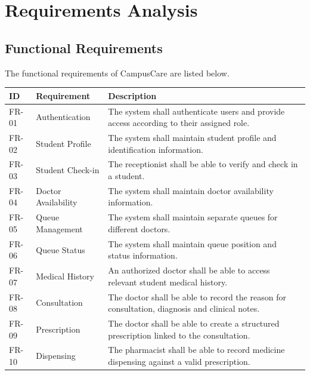 \documentclass{tietreport}
\begin{document}
\chapter{Requirements Analysis}

\section{Functional Requirements}

The functional requirements of CampusCare are listed below.

\begin{longtable}{p{1.3cm}p{4.0cm}p{7.0cm}}
\toprule
\textbf{ID} & \textbf{Requirement} & \textbf{Description} \\
\midrule

FR-01 &
Authentication &
The system shall authenticate users and provide access according to
their assigned role. \\

FR-02 &
Student Profile &
The system shall maintain student profile and identification
information. \\

FR-03 &
Student Check-in &
The receptionist shall be able to verify and check in a student. \\

FR-04 &
Doctor Availability &
The system shall maintain doctor availability information. \\

FR-05 &
Queue Management &
The system shall maintain separate queues for different doctors. \\

FR-06 &
Queue Status &
The system shall maintain queue position and status information. \\

FR-07 &
Medical History &
An authorized doctor shall be able to access relevant student medical
history. \\

FR-08 &
Consultation &
The doctor shall be able to record the reason for consultation,
diagnosis and clinical notes. \\

FR-09 &
Prescription &
The doctor shall be able to create a structured prescription linked
to the consultation. \\

FR-10 &
Dispensing &
The pharmacist shall be able to record medicine dispensing against a
valid prescription. \\


\end{longtable}
\end{document}
